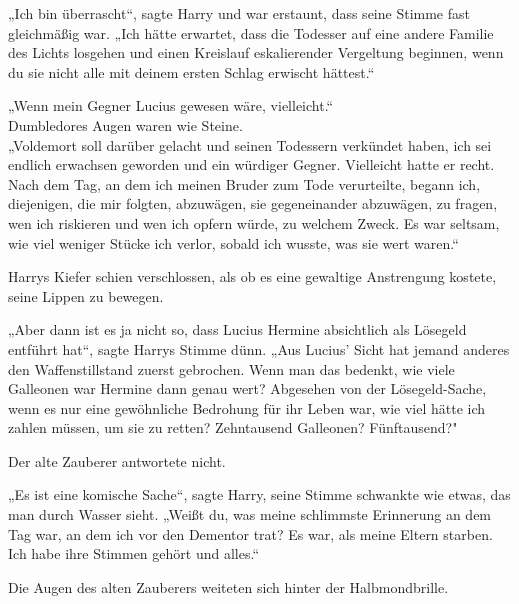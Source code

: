 {„Ich bin überrascht“, sagte Harry und war erstaunt, dass seine Stimme fast gleichmäßig war. „Ich hätte erwartet, dass die Todesser auf eine andere Familie des Lichts losgehen und einen Kreislauf eskalierender Vergeltung beginnen, wenn du sie nicht alle mit deinem ersten Schlag erwischt hättest.“

„Wenn mein Gegner Lucius gewesen wäre, vielleicht.“\\ Dumbledores Augen waren wie Steine.\\ „Voldemort soll darüber gelacht und seinen Todessern verkündet haben, ich sei endlich erwachsen geworden und ein würdiger Gegner. Vielleicht hatte er recht. Nach dem Tag, an dem ich meinen Bruder zum Tode verurteilte, begann ich, diejenigen, die mir folgten, abzuwägen, sie gegeneinander abzuwägen, zu fragen, wen ich riskieren und wen ich opfern würde, zu welchem Zweck. Es war seltsam, wie viel weniger Stücke ich verlor, sobald ich wusste, was sie wert waren.“

Harrys Kiefer schien verschlossen, als ob es eine gewaltige Anstrengung kostete, seine Lippen zu bewegen.

„Aber dann ist es ja nicht so, dass Lucius Hermine absichtlich als Lösegeld entführt hat“, sagte Harrys Stimme dünn. „Aus Lucius' Sicht hat jemand anderes den Waffenstillstand zuerst gebrochen. Wenn man das bedenkt, wie viele Galleonen war Hermine dann genau wert? Abgesehen von der Lösegeld-Sache, wenn es nur eine gewöhnliche Bedrohung für ihr Leben war, wie viel hätte ich zahlen müssen, um sie zu retten? Zehntausend Galleonen? Fünftausend?"

Der alte Zauberer antwortete nicht.

„Es ist eine komische Sache“, sagte Harry, seine Stimme schwankte wie etwas, das man durch Wasser sieht. „Weißt du, was meine schlimmste Erinnerung an dem Tag war, an dem ich vor den Dementor trat? Es war, als meine Eltern starben. Ich habe ihre Stimmen gehört und alles.“

Die Augen des alten Zauberers weiteten sich hinter der Halbmondbrille.

}
